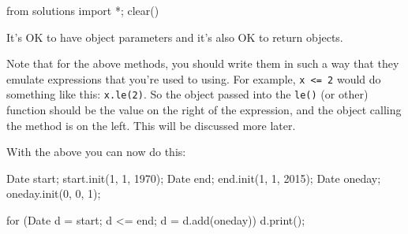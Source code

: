 \begin{python0}
from solutions import *; clear()
\end{python0}

It's OK to have object parameters and
it's also OK to return objects.





Note that for the above methods, you should write them in such a way
that they emulate expressions that you're used to using. For example, \texttt{x
<= 2} would do something like this: \texttt{x.le(2)}. So the object passed into
the \texttt{le()} (or other) function should be the value on the right of the
expression, and the object calling the method is on the left. This will be
discussed more later.

With the above you can now do this:

\begin{consolethree}[escapeinside=||]
Date start;
start.init(1, 1, 1970);
Date end;
end.init(1, 1, 2015);
Date oneday;
oneday.init(0, 0, 1);

for (Date d = start; d <= end; d = d.add(oneday))
{
    d.print();
}
\end{consolethree}



